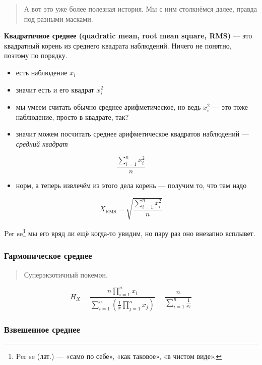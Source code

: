 \documentclass[
  letterpaper,
]{scrbook}
\providecommand{\tightlist}{%
  \setlength{\itemsep}{0pt}\setlength{\parskip}{0pt}}\usepackage{longtable,booktabs,array}
\theoremstyle{definition}
\theoremstyle{remark}
\begin{document}
\begin{quote}
А вот это уже более полезная история. Мы с ним столкнёмся далее, правда
под разными масками.
\end{quote}

\textbf{Квадратичное среднее (quadratic mean, root mean square, RMS)}
--- это квадратный корень из среднего квадрата наблюдений. Ничего не
понятно, поэтому по порядку.

\begin{itemize}
\tightlist
\item
  есть наблюдение \(x_i\)
\item
  значит есть и его квадрат \(x_i^2\)
\item
  мы умеем считать обычно среднее арифметическое, но ведь \(x_i^2\) ---
  это тоже наблюдение, просто в квадрате, так?
\item
  значит можем посчитать среднее арифметическое квадратов наблюдений ---
  \emph{средний квадрат}
\end{itemize}

\[
\frac{\sum_{i=1}^n x_i^2}{n}
\]

\begin{itemize}
\tightlist
\item
  норм, а теперь извлечём из этого дела корень --- получим то, что там
  надо
\end{itemize}

\[
X_{\mathrm{RMS}} = \sqrt{\frac{\sum_{i=1}^n x_i^2}{n}}
\]

Per se\footnote{Per se (лат.) --- «само по себе», «как таковое», «в
  чистом виде».} мы его вряд ли ещё когда-то увидим, но пару раз оно
внезапно всплывет.

\subsubsection{Гармоническое
среднее}\label{andan-descriptives-harmonic-mean}

\begin{quote}
Суперэкзотичный покемон.
\end{quote}

\[
H_X = \frac{n \prod_{i=1}^n x_i}{\sum_{i=1}^n (\tfrac{1}{x} \prod_{j=1}^n x_j)} = \frac{n}{\sum_{i=1}^n \tfrac{1}{x_i}}
\]

\subsubsection{Взвешенное
среднее}\label{andan-descriptives-weighted-mean}
\end{document}
